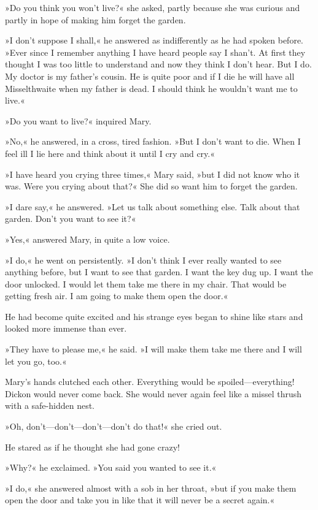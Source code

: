 »Do you think you won't live?« she asked, partly because she was curious and partly in hope of making him forget the garden.

»I don't suppose I shall,« he answered as indifferently as he had spoken before. »Ever since I remember anything I have heard people say I shan't. At first they thought I was too little to understand and now they think I don't hear. But I do. My doctor is my father's cousin. He is quite poor and if I die he will have all Misselthwaite when my father is dead. I should think he wouldn't want me to live.«

»Do you want to live?« inquired Mary.

»No,« he answered, in a cross, tired fashion. »But I don't want to die. When I feel ill I lie here and think about it until I cry and cry.«

»I have heard you crying three times,« Mary said, »but I did not know who it was. Were you crying about that?« She did so want him to forget the garden.

»I dare say,« he answered. »Let us talk about something else. Talk about that garden. Don't you want to see it?«

»Yes,« answered Mary, in quite a low voice.

»I do,« he went on persistently. »I don't think I ever really wanted to see anything before, but I want to see that garden. I want the key dug up. I want the door unlocked. I would let them take me there in my chair. That would be getting fresh air. I am going to make them open the door.«

He had become quite excited and his strange eyes began to shine like stars and looked more immense than ever.

»They have to please me,« he said. »I will make them take me there and I will let you go, too.«

Mary's hands clutched each other. Everything would be spoiled—everything! Dickon would never come back. She would never again feel like a missel thrush with a safe-hidden nest.

»Oh, don't—don't—don't—don't do that!« she cried out.

He stared as if he thought she had gone crazy!

»Why?« he exclaimed. »You said you wanted to see it.«

»I do,« she answered almost with a sob in her throat, »but if you make them open the door and take you in like that it will never be a secret again.«

